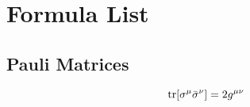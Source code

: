 \chapter{Formula List}
  \section{Pauli Matrices}
  \begin{equation}\label{pauli matrice property one}
  \text{tr}[\sigma^{\mu}\bar{\sigma}^{\nu}] = 2 g^{\mu\nu}
  \end{equation}